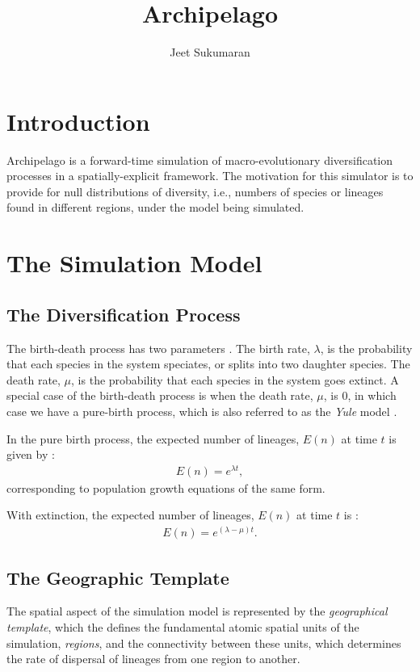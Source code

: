 \documentclass[11pt]{article}
\title{Archipelago}
\author{Jeet Sukumaran}
\begin{document}
\maketitle
\section*{Introduction}
Archipelago is a forward-time simulation of macro-evolutionary diversification processes in a spatially-explicit framework.
The motivation for this simulator is to provide for null distributions of diversity, i.e., numbers of species or lineages found in different regions, under the model being simulated.

\section*{The Simulation Model}

\subsection*{The Diversification Process}
The birth-death process has two parameters \citep{Mooers1997,aldous2001stochastic}.
The birth rate, $\lambda$, is the probability that each species in the system speciates, or splits into two daughter species.
The death rate, $\mu$, is the probability that each species in the system goes extinct.
A special case of the birth-death process is when the death rate, $\mu$, is 0, in which case we have a pure-birth process, which is also referred to as the \textit{Yule} model \citep{Mooers1997, Yule1924}.

In the pure birth process, the expected number of lineages, $E(n)$ at time $t$ is given by \citep{ricklefs2007estimating}:
\begin{align*}
E(n) = e^{\lambda t},
\end{align*}
corresponding to population growth equations of the same form.

With extinction, the expected number of lineages, $E(n)$ at time $t$ is \citep{ricklefs2007estimating}:
\begin{align*}
E(n) = e^{(\lambda-\mu) t}.
\end{align*}

\subsection*{The Geographic Template}

The spatial aspect of the simulation model is represented by the \textit{geographical template}, which the defines the fundamental atomic spatial units of the simulation, \textit{regions}, and the connectivity between these units, which determines the rate of dispersal of lineages from one region to another.
\end{document}
